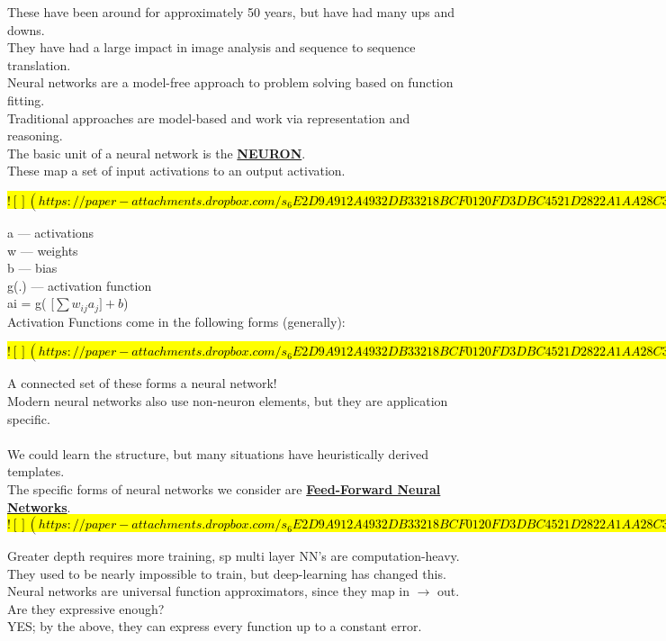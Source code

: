 \documentclass[../../lecture_notes.tex]{subfiles}
\begin{document}
\noindent These have been around for approximately 50 years, but have had many ups and downs.\\
They have had a large impact in image analysis and sequence to sequence translation.\\
Neural networks are a model-free approach to problem solving based on function fitting.\\
Traditional approaches are model-based and work via representation and reasoning.\\

\noindent The basic unit of a neural network is the \textbf{\underline{NEURON}}.\\
These map a set of input activations to an output activation.

\hl{
$![](https://paper-attachments.dropbox.com/s_6E2D9A912A4932DB33218BCF0120FD3DBC4521D2822A1AA28C3A628B5392148D_1591131415565_Untitled+drawing.jpg)$
}

\noindent a — activations\\
w — weights\\
b — bias\\
g(.) — activation function\\
ai = g( [$\sum w_{ij} a_j] + b$)\\

Activation Functions come in the following forms (generally):

\hl{
$![](https://paper-attachments.dropbox.com/s_6E2D9A912A4932DB33218BCF0120FD3DBC4521D2822A1AA28C3A628B5392148D_1591132106832_Untitled+drawing+1.jpg)$
}

\noindent A connected set of these forms a neural network!\\
Modern neural networks also use non-neuron elements, but they are application specific.\\
\\
We could learn the structure, but many situations have heuristically derived templates.\\
The specific forms of neural networks we consider are \textbf{\underline{Feed-Forward Neural Networks}}.\\

\hl{
$![](https://paper-attachments.dropbox.com/s_6E2D9A912A4932DB33218BCF0120FD3DBC4521D2822A1AA28C3A628B5392148D_1591132562633_Untitled+drawing+2.jpg)$
}

\noindent Greater depth requires more training, sp multi layer NN’s are computation-heavy.\\
They used to be nearly impossible to train, but deep-learning has changed this.\\
Neural networks are universal function approximators, since they map in $\to$ out.\\
Are they expressive enough? \\
	\indent YES; by the above, they can express every function up to a constant error.\\
\end{document}
